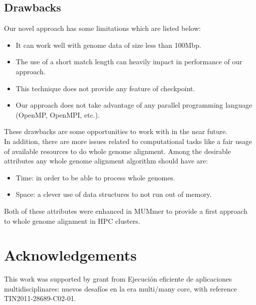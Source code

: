 \documentclass[twocolumn,twoside]{Jornadas}
\begin{document}
\subsection{Drawbacks}
Our novel approach has some limitations which are listed below:
\begin{itemize}
  \item It can work well with genome data of size less than 100Mbp.
  \item The use of a short match length can heavily impact in performance of our approach.
  \item This technique does not provide any feature of checkpoint.
  \item Our approach does not take advantage of any parallel programming language (OpenMP, OpenMPI, etc.).
\end{itemize}
These drawbacks are some opportunities to work with in the near future.\\
In addition, there are more issues related to computational tasks like a fair usage of available resources to do whole genome alignment. Among the desirable attributes any whole genome alignment algorithm should have are:
\begin{itemize}
\item Time: in order to be able to process whole genomes.
\item Space: a clever use of data structures to not run out of memory. 
\end{itemize}
Both of these attributes were enhanced in MUMmer to provide a first approach to whole genome alignment in HPC clusters.
\section*{Acknowledgements}
This work was supported by grant from Ejecuci\'on eficiente de aplicaciones multidisciplinares: nuevos desaf\'ios en la 
era multi/many core, with reference TIN2011-28689-C02-01.
 
\end{document}
